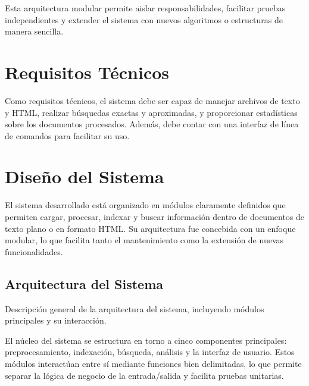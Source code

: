 \documentclass[9pt,letterpaper,onecolumn]{rho-class/rho}
\begin{document}
Esta arquitectura modular permite aislar responsabilidades, facilitar pruebas independientes y extender el sistema con nuevos algoritmos o estructuras de manera sencilla.


\section{Requisitos Técnicos}
Como requisitos técnicos, el sistema debe ser capaz de manejar archivos de texto y HTML, realizar búsquedas exactas y aproximadas, y proporcionar estadísticas sobre los documentos procesados. Además, debe contar con una interfaz de línea de comandos para facilitar su uso.


\section{Diseño del Sistema}
\label{sec:diseno}

El sistema desarrollado está organizado en módulos claramente definidos que permiten cargar, procesar, indexar y buscar información dentro de documentos de texto plano o en formato HTML. Su arquitectura fue concebida con un enfoque modular, lo que facilita tanto el mantenimiento como la extensión de nuevas funcionalidades.

\subsection{Arquitectura del Sistema}
Descripción general de la arquitectura del sistema, incluyendo módulos principales y su interacción.

El núcleo del sistema se estructura en torno a cinco componentes principales: preprocesamiento, indexación, búsqueda, análisis y la interfaz de usuario. Estos módulos interactúan entre sí mediante funciones bien delimitadas, lo que permite separar la lógica de negocio de la entrada/salida y facilita pruebas unitarias.
\end{document}
